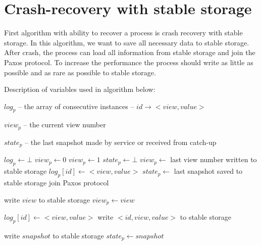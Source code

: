 \section{Crash-recovery with stable storage}
\label{sec:full_ss}

First algorithm with ability to recover a process is crash recovery with stable storage. In this algorithm, we want to save all necessary data to stable storage. After crash, the process can load all information from stable storage and join the Paxos protocol. \linebreak To increase the performance the process should write as little as possible and as rare as possible to stable storage.

Description of variables used in algorithm below:
\begin{tightList}[\setlength{\labelwidth}{20em} \setlength{\leftmargin}{2\leftmargin}]
  \item[$log_p$] -- the array of consecutive instances -- $id \rightarrow <view, value>$
  \item[$view_p$] -- the current view number
  \item[$state_p$] -- the last snapshot made by service or received from catch-up
\end{tightList}

\begin{algorithmic}[1]
  \INIT{}
    \STATE $log_p \leftarrow \bot$ %
    \STATE $view_p \leftarrow 0$
      \STATE $view_p \leftarrow 1$
    \ENDIF
    \STATE $state_p \leftarrow \bot$ %
    \STATE
      \STATE $view_p \leftarrow$ last view number written to stable storage
        \STATE $log_p[id] \leftarrow <view, value>$
      \ENDFOR
      \STATE $state_p \leftarrow$ last snapshot saved to stable storage
    \ENDIF
    \STATE
    \STATE join Paxos protocol
  \ENDINIT

  \vspace{1em}
    \STATE write $view$ to stable storage
    \STATE $view_p \leftarrow view$
  \ENDPROC

  \vspace{1em}
    \STATE $log_p[id] \leftarrow <view, value>$
    \STATE write $<id, view, value>$ to stable storage
  \ENDPROC

  \vspace{1em}
    \STATE write $snapshot$ to stable storage
    \STATE $state_p \leftarrow snapshot$ 
  \ENDPROC
\end{algorithmic}

